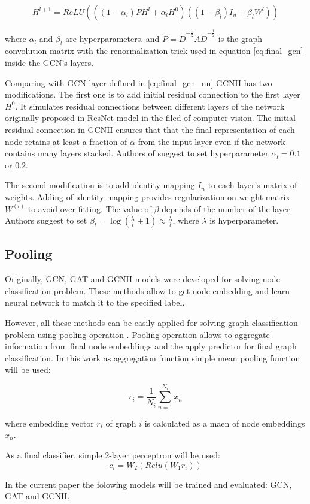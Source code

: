 \begin{equation}
    H^{l+1} = ReLU\left( ((1-\alpha_{l})\tilde{P}H^{l} + \alpha_{l}H^{0}) ((1-\beta_{l})I_n + \beta_{l} W^{l})  \right)
    \label{eq:gcnii_layer}
\end{equation}

where $\alpha_l$ and $\beta_l$ are hyperparameters.
and $\tilde{P} = \tilde{D}^{-\frac{1}{2}}A\tilde{D}^{-\frac{1}{2}}$ is the graph 
convolution matrix with the renormalization trick used in equation \ref{eq:final_gcn} inside the GCN's layers.

Comparing with GCN layer defined in \ref{eq:final_gcn_nn} GCNII has two modifications.
The first one is to add initial residual connection to the first layer $H^0$. It simulates 
residual connections between different layers of the network originally proposed in 
ResNet model \cite{ResNet} in the filed of computer vision. 
The initial residual connection in GCNII ensures that that the final representation
of each node retains at least a fraction of $\alpha$ from the input layer even if the network contains
many layers stacked. Authors of \cite{GCNII} suggest to set hyperparameter $\alpha_l = 0.1$ or $0.2$.


The second modification is to add identity mapping $I_n$ to each layer's matrix of weights.
Adding of identity mapping provides regularization on weight matrix $W^{(l)}$ to avoid over-fitting.
The value of $\beta$ depends of the number of the layer. Authors suggest to set $\beta_l = \log(\frac{\lambda}{l}+1) \approx \frac{\lambda}{l}$,
where $\lambda$ is hyperparameter. 

\subsection{Pooling}
Originally, GCN, GAT and GCNII models were developed for solving node classification problem.
These methods allow to get node embedding and learn neural network to match it to the specified label.

However, all these methods can be easily applied for solving graph classification problem using pooling operation \cite{distillGCN}.
Pooling operation allows to aggregate information from final node embeddings and the apply predictor for final graph classification.
In this work as aggregation function simple mean pooling function will be used:

\begin{equation}
    r_i = \frac{1}{N_i}\sum_{n=1}^{N_i}x_n
    \label{eq:mean_pool}
\end{equation}

where embedding vector $r_i$ of graph $i$ is calculated as a maen of node embeddings $x_n$.

As a final classifier, simple 2-layer perceptron will be used:
\begin{equation}
    c_i = W_2(Relu(W_1r_i))
    \label{eq:final_classifier}
\end{equation}

In the current paper the folowing models will be trained and evaluated: GCN\cite{GCN}, GAT\cite{GAT} and GCNII\cite{GCNII}.